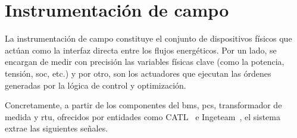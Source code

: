\section{Instrumentación de campo}%
\label{makereference3.2}

La instrumentación de campo constituye el conjunto de dispositivos físicos que actúan como la interfaz directa entre los flujos energéticos. Por un lado, se encargan de medir con precisión las variables físicas clave (como la potencia, tensión, \gls{soc}, etc.) y por otro, son los actuadores que ejecutan las órdenes generadas por la lógica de control y optimización.

Concretamente, a partir de los componentes del \gls{bms}, \gls{pcs}, transformador de medida y \gls{rtu}, ofrecidos por entidades como CATL~\cite{catl2023catl} e Ingeteam~\cite{ingeteam2025ingeteam}, el sistema extrae las siguientes señales.

